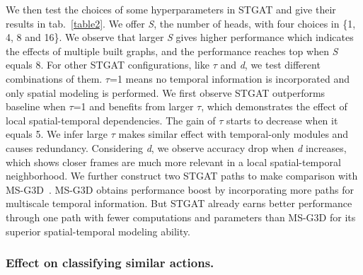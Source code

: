 \documentclass[runningheads]{llncs}
\begin{document}
We then test the choices of some hyperparameters in STGAT and give their results in tab.~\ref{table2}. We offer \textit{S}, the number of heads, with four choices in \{1, 4, 8 and 16\}. We observe that larger \textit{S} gives higher performance which indicates the effects of multiple built graphs, and the performance reaches top when \textit{S} equals 8. For other STGAT configurations, like $\tau$ and \textit{d}, we test different combinations of them. $\tau$=1 means no temporal information is incorporated and only spatial modeling is performed. We first observe STGAT outperforms baseline when $\tau$=1 and benefits from larger $\tau$, which demonstrates the effect of local spatial-temporal dependencies. The gain of $\tau$ starts to decrease when it equals 5. We infer large $\tau$ makes similar effect with temporal-only modules and causes redundancy. Considering \textit{d}, we observe accuracy drop when \textit{d} increases, which shows closer frames are much more relevant in a local spatial-temporal neighborhood. We further construct two STGAT paths to make comparison with MS-G3D~\cite{liu2020disentangling}. MS-G3D obtains performance boost by incorporating more paths for multiscale temporal information. But STGAT already earns better performance through one path with fewer computations and parameters than MS-G3D for its superior spatial-temporal modeling ability.

\subsubsection{Effect on classifying similar actions.}
\end{document}
